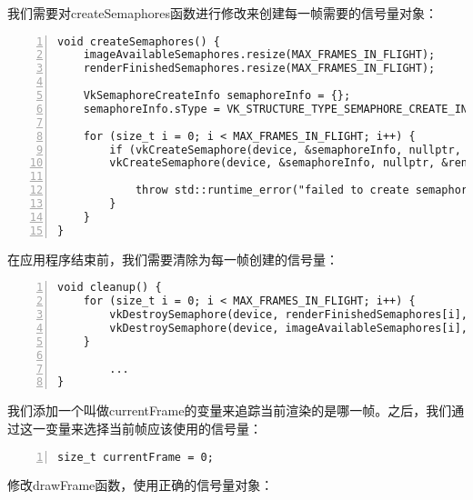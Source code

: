 \documentclass{ctexart}
\begin{document}
我们需要对createSemaphores函数进行修改来创建每一帧需要的信号量对象：

\begin{lstlisting}[language={[ANSI]C},keywordstyle=\color{blue!70},commentstyle=\color{red!50!green!50!blue!50},frame=shadowbox, rulesepcolor=\color{red!20!green!20!blue!20},basicstyle=\small,numbers=left, numberstyle=\tiny,breaklines=true]
void createSemaphores() {
	imageAvailableSemaphores.resize(MAX_FRAMES_IN_FLIGHT);
	renderFinishedSemaphores.resize(MAX_FRAMES_IN_FLIGHT);

	VkSemaphoreCreateInfo semaphoreInfo = {};
	semaphoreInfo.sType = VK_STRUCTURE_TYPE_SEMAPHORE_CREATE_INFO;

	for (size_t i = 0; i < MAX_FRAMES_IN_FLIGHT; i++) {
		if (vkCreateSemaphore(device, &semaphoreInfo, nullptr, &imageAvailableSemaphores[i]) != VK_SUCCESS ||
		vkCreateSemaphore(device, &semaphoreInfo, nullptr, &renderFinishedSemaphores[i]) != VK_SUCCESS) {

			throw std::runtime_error("failed to create semaphores for a frame!");
		}
	}
}
\end{lstlisting}

在应用程序结束前，我们需要清除为每一帧创建的信号量：

\begin{lstlisting}[language={[ANSI]C},keywordstyle=\color{blue!70},commentstyle=\color{red!50!green!50!blue!50},frame=shadowbox, rulesepcolor=\color{red!20!green!20!blue!20},basicstyle=\small,numbers=left, numberstyle=\tiny,breaklines=true]
void cleanup() {
	for (size_t i = 0; i < MAX_FRAMES_IN_FLIGHT; i++) {
		vkDestroySemaphore(device, renderFinishedSemaphores[i], nullptr);
		vkDestroySemaphore(device, imageAvailableSemaphores[i], nullptr);
	}

		...
}
\end{lstlisting}

我们添加一个叫做currentFrame的变量来追踪当前渲染的是哪一帧。之后，我们通过这一变量来选择当前帧应该使用的信号量：

\begin{lstlisting}[language={[ANSI]C},keywordstyle=\color{blue!70},commentstyle=\color{red!50!green!50!blue!50},frame=shadowbox, rulesepcolor=\color{red!20!green!20!blue!20},basicstyle=\small,numbers=left, numberstyle=\tiny,breaklines=true]
size_t currentFrame = 0;
\end{lstlisting}

修改drawFrame函数，使用正确的信号量对象：
\end{document}
